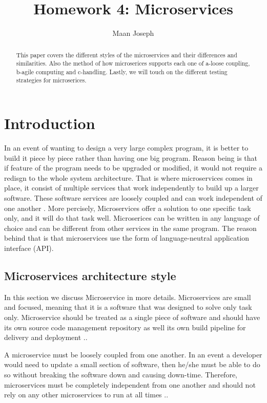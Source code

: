 \documentclass{IEEEtran}
\title{Homework 4: Microservices}
\author{Maan Joseph}
\begin{document}
	\maketitle
	\begin{abstract}
		This paper covers the different styles of the microservices and their differences and similarities. Also the method of how microserices supports each one of a-loose coupling, b-agile computing and c-handling. Lastly, we will touch on the different testing strategies for microserices.   
	\end{abstract}

	\section{Introduction}
		In an event of wanting to design a very large complex program, it is better to build it piece by piece rather than having one big program. Reason being is that if feature of the program needs to be upgraded or modified, it would not require a redisgn to the whole system architecture. That is where microservices comes in place, it consist of multiple services that work independently to build up a larger software. These software services are loosely coupled and can work independent of one another \cite{ibmred}. More percisely, Microservices offer a solution to one specific task only, and it will do that task well. Microserices can be written in any language of choice and can be different from other services in the same program. The reason behind that is that microservices use the form of language-neutral application interface (API).


		\subsection{Microservices architecture style}
			In this section we discuss Microservice in more details. Microservices are small and focused, meaning that it is a software that was designed to solve only task only. Microservice should be treated as a single piece of software and should have its own source code management repository as well its own build pipeline for delivery and deployment \cite{ibmred}..
			\newline
			
			
			A microservice must be loosely coupled from one another. In an event a developer would need to update a small section of software, then he/she must be able to do so without breaking the software down and causing down-time. Therefore, microservices must be completely independent from one another and should not rely on any other microservices to run at all times \cite{ibmred}..
			\newline
			
\end{document}
